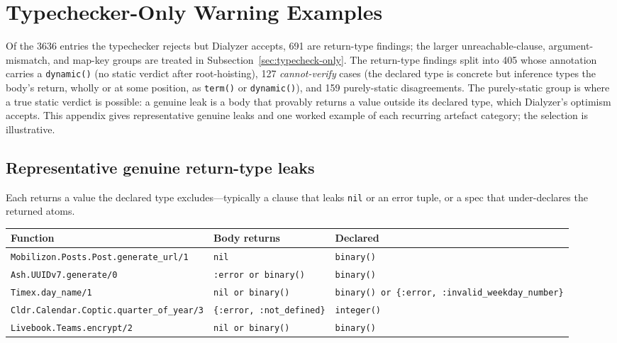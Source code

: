 \chapter{Typechecker-Only Warning Examples}
\label{app:typecheck-examples}
\sloppy

Of the \num{3636} entries the typechecker rejects but Dialyzer accepts, 691 are return-type findings; the larger unreachable-clause, argument-mismatch, and map-key groups are treated in Subsection~\ref{sec:typecheck-only}.
The return-type findings split into 405 whose annotation carries a \texttt{dynamic()} (no static verdict after root-hoisting), 127 \emph{cannot-verify} cases (the declared type is concrete but inference types the body's return, wholly or at some position, as \texttt{term()} or \texttt{dynamic()}), and 159 purely-static disagreements.
The purely-static group is where a true static verdict is possible: a genuine leak is a body that provably returns a value outside its declared type, which Dialyzer's optimism accepts.
This appendix gives representative genuine leaks and one worked example of each recurring artefact category; the selection is illustrative.

\section*{Representative genuine return-type leaks}
Each returns a value the declared type excludes---typically a clause that leaks \texttt{nil} or an error tuple, or a spec that under-declares the returned atoms.

\footnotesize
\setlength{\tabcolsep}{4pt}
\begin{tabular}{@{}p{} >{\raggedright\arraybackslash}p{} >{\raggedright\arraybackslash}p{}@{}}
\toprule \textbf{Function} & \textbf{Body returns} & \textbf{Declared} \\ \midrule
\texttt{Mobilizon.Posts.Post.generate\_url/1} & \texttt{nil} & \texttt{binary()} \\
\texttt{Ash.UUIDv7.generate/0} & \texttt{:error or binary()} & \texttt{binary()} \\
\texttt{Timex.day\_name/1} & \texttt{nil or binary()} & \texttt{binary() or \{:error, :invalid\_weekday\_number\}} \\
\texttt{Cldr.Calendar.Coptic.quarter\_of\_year/3} & \texttt{\{:error, :not\_defined\}} & \texttt{integer()} \\
\texttt{Livebook.Teams.encrypt/2} & \texttt{nil or binary()} & \texttt{binary()} \\
\bottomrule
\end{tabular}
\normalsize

